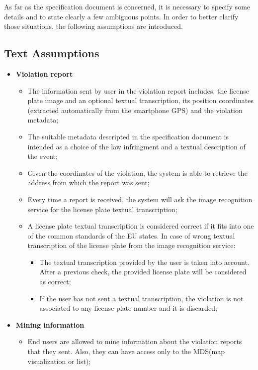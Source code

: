As far as the specification document is concerned, it is necessary to specify some details and to state clearly a few ambiguous points. In order to better clarify those situations, the following assumptions are introduced.
\newpage\subsection{Text Assumptions}
\begin{itemize}
    \item \textbf{Violation report}
        \begin{itemize}
            \item The information sent by user in the violation report includes: the license plate image and an optional textual transcription, its position coordinates (extracted automatically from the smartphone GPS) and the violation metadata;
            \item The suitable metadata descripted in the specification document is intended as a choice of the law infringment and a textual description of the event;
            \item Given the coordinates of the violation, the system is able to retrieve the address from which the report was sent;
            \item Every time a report is received, the system will ask the image recognition service for the license plate textual transcription;
            \item A license plate textual transcription is considered correct if it fits into one of the common standards of the EU states. In case of wrong textual transcription of the license plate from the image recognition service:
            \begin{itemize}
                \item The textual transcription provided by the user is taken into account. After a previous check, the provided license plate will be considered as correct;
                \item If the user has not sent a textual transcription, the violation is not associated to any license plate number and it is discarded;
            \end{itemize} 
        \end{itemize}
    \item \textbf{Mining information} 
        \begin{itemize}
            \item End users are allowed to mine information about the violation reports that they sent. Also, they can have access only to the MDS(map visualization or list);

\end{itemize}
\end{itemize}
